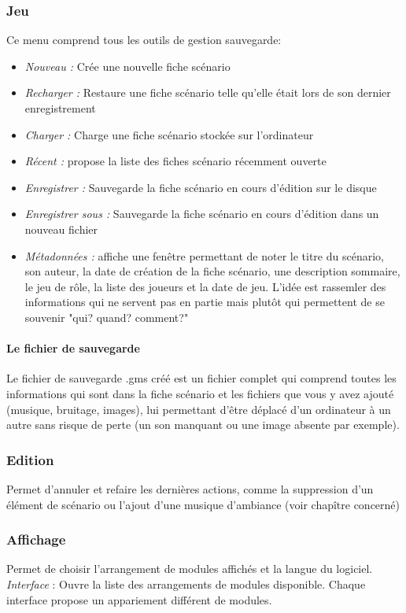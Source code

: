 \documentclass[a4paper,12pt]{article}
\begin{document}
\subsubsection{Jeu}
Ce menu comprend tous les outils de gestion sauvegarde:
\begin{itemize}
    \item \emph{Nouveau :} Crée une nouvelle fiche scénario
    \item \emph{Recharger :} Restaure une fiche scénario telle qu'elle était lors de son dernier enregistrement
    \item \emph{Charger :} Charge une fiche scénario stockée sur l'ordinateur
    \item \emph{Récent :} propose la liste des fiches scénario récemment ouverte
    \item \emph{Enregistrer :} Sauvegarde la fiche scénario en cours d'édition sur le disque
    \item \emph{Enregistrer sous :} Sauvegarde la fiche scénario en cours d'édition dans un nouveau fichier
    \item \emph{Métadonnées :} affiche une fenêtre permettant de noter le titre du scénario, son auteur, la date de création de la fiche scénario, une description sommaire, le jeu de rôle, la liste des joueurs et la date de jeu. L'idée est rassemler des informations qui ne servent pas en partie mais plutôt qui permettent de se souvenir "qui? quand? comment?"
\end{itemize}
\paragraph{Le fichier de sauvegarde}
Le fichier de sauvegarde .gms créé est un fichier complet qui comprend toutes les informations qui sont dans la fiche scénario et les fichiers que vous y avez ajouté (musique, bruitage, images), lui permettant d'être déplacé d'un ordinateur à un autre sans risque de perte (un son manquant ou une image absente par exemple).
\subsubsection{Edition}
Permet d'annuler et refaire les dernières actions, comme la suppression d'un élément de scénario ou l'ajout d'une musique d'ambiance (voir chapître concerné)
\subsubsection{Affichage}
Permet de choisir l'arrangement de modules affichés et la langue du logiciel.
\emph{Interface} : Ouvre la liste des arrangements de modules disponible. Chaque interface propose un appariement différent de modules.
\end{document}
